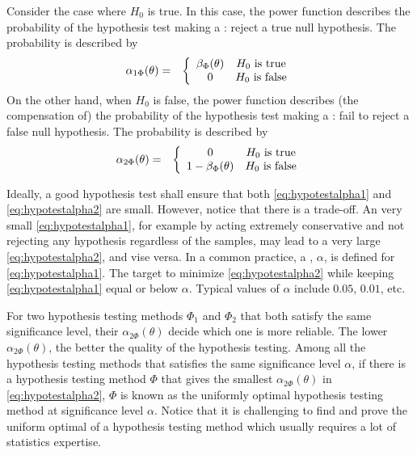 Consider the case where $H_0$ is true. In this case, the power function describes the probability of the hypothesis test making a : reject a true null hypothesis. The probability is described by
\begin{eqnarray}
	\alpha_{1\Phi}(\theta) &=& \left\{\begin{array}{cc}
		\beta_\Phi(\theta) & H_0 \textup{~is true} \\
		0 & H_0 \textup{~is false}
	\end{array}\right. \label{eq:hypotestalpha1}
\end{eqnarray}
On the other hand, when $H_0$ is false, the power function describes (the compensation of) the probability of the hypothesis test making a : fail to reject a false null hypothesis. The probability is described by
\begin{eqnarray}
	\alpha_{2\Phi}(\theta) &=& \left\{\begin{array}{cc}
		0 & H_0 \textup{~is true} \\
		1-\beta_\Phi(\theta) & H_0 \textup{~is false}
	\end{array}\right. \label{eq:hypotestalpha2}
\end{eqnarray}

Ideally, a good hypothesis test shall ensure that both \eqref{eq:hypotestalpha1} and \eqref{eq:hypotestalpha2} are small. However, notice that there is a trade-off. An very small \eqref{eq:hypotestalpha1}, for example by acting extremely conservative and not rejecting any hypothesis regardless of the samples, may lead to a very large \eqref{eq:hypotestalpha2}, and vise versa. In a common practice, a , $\alpha$, is defined for \eqref{eq:hypotestalpha1}. The target to minimize \eqref{eq:hypotestalpha2} while keeping \eqref{eq:hypotestalpha1} equal or below $\alpha$. Typical values of $\alpha$ include $0.05$, $0.01$, etc. 

For two hypothesis testing methods $\Phi_1$ and $\Phi_2$ that both satisfy the same significance level, their $\alpha_{2\Phi}(\theta)$ decide which one is more reliable. The lower $\alpha_{2\Phi}(\theta)$, the better the quality of the hypothesis testing. Among all the hypothesis testing methods that satisfies the same significance level $\alpha$, if there is a hypothesis testing method $\Phi$ that gives the smallest $\alpha_{2\Phi}(\theta)$ in \eqref{eq:hypotestalpha2}, $\Phi$ is known as the uniformly optimal hypothesis testing method at significance level $\alpha$. Notice that it is challenging to find and prove the uniform optimal of a hypothesis testing method which usually requires a lot of statistics expertise.

